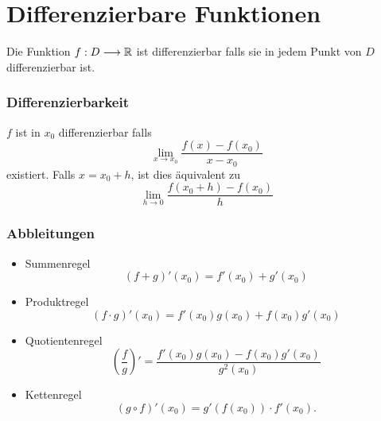 \part{Differenzierbare Funktionen}
\setcounter{section}{0}
\Def Die Funktion $f: D \longrightarrow \mathbb{R}$ ist differenzierbar falls sie in jedem Punkt von $D$ differenzierbar ist.

\section{Differenzierbarkeit}

\Def $f$ ist in $x_0$ differenzierbar falls 
$$\lim \limits_{x \rightarrow x_{0}} \frac{f(x)-f\left(x_{0}\right)}{x-x_{0}}$$
existiert. Falls $x=x_0+h$, ist dies äquivalent zu
$$\lim \limits_{h \rightarrow 0} \frac{f\left(x_{0}+h\right)-f\left(x_{0}\right)}{h}$$

\section{Abbleitungen}
\Satz[Ableitungsregeln]
\begin{itemize}
  \item Summenregel
  \[(f+g)'(x_0) = f'(x_0) + g'(x_0)\]
  \item Produktregel
  \[(f\cdot g)'(x_0) = f'(x_0)g(x_0) + f(x_0)g'(x_0)\]
  \item Quotientenregel
  \[\left(\frac{f}{g}\right)'=
  \frac{f'(x_0)g(x_0) - f(x_0)g'(x_0)}{g^2(x_0)}\]
  \item Kettenregel \[
	(g\circ f)'(x_0) = g'(f(x_0))\cdot f'(x_0).
  \]
\end{itemize}




